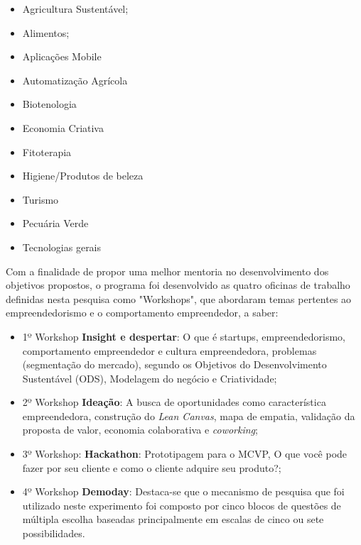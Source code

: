 \begin{multicols}{2}
\centering
    \begin{itemize}
    \item{Agricultura Sustentável;}
    \item{Alimentos;}
    \item{Aplicações Mobile}
    \item{Automatização Agrícola}
    \item{Biotenologia}
    \item{Economia Criativa}
    \item{Fitoterapia}
    \item{Higiene/Produtos de beleza}
    \item{Turismo}
    \item{Pecuária Verde}
    \item{Tecnologias gerais}
\end{itemize}
\end{multicols}



Com a finalidade de propor uma melhor mentoria no desenvolvimento dos objetivos propostos, o programa foi desenvolvido as quatro oficinas de trabalho definidas nesta pesquisa como  "Workshops", que abordaram temas pertentes ao empreendedorismo e o comportamento empreendedor, a saber:

\begin{itemize}

\item {1º Workshop \textbf{Insight e despertar}: O que é startups, empreendedorismo, comportamento empreendedor e cultura empreendedora, problemas (segmentação do mercado), segundo os Objetivos do Desenvolvimento Sustentável (ODS), Modelagem do negócio e Criatividade;}
\item {2º Workshop \textbf{Ideação}: A busca de oportunidades como característica empreendedora, construção do \textit{\textit{Lean Canvas}}, mapa de empatia, validação da proposta de valor, economia colaborativa e \textit{coworking};}

\item {3º Workshop: \textbf{Hackathon}: Prototipagem para o MCVP, O que você pode fazer por seu cliente e como o cliente adquire seu produto?;}

\item {4º Workshop \textbf{Demoday}: Destaca-se que o mecanismo de pesquisa que foi utilizado neste experimento foi composto por cinco blocos de questões de múltipla escolha baseadas principalmente em escalas de cinco ou sete possibilidades.}
\end{itemize}


